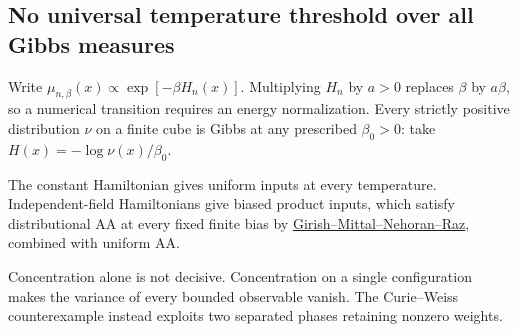 \subsection{No universal temperature threshold over all Gibbs measures}

Write $\mu_{n,\beta}(x)\propto\exp[-\beta H_n(x)]$. Multiplying $H_n$ by $a>0$ replaces $\beta$ by $a\beta$, so a numerical transition requires an energy normalization. Every strictly positive distribution $\nu$ on a finite cube is Gibbs at any prescribed $\beta_0>0$: take $H(x)=-\log\nu(x)/\beta_0$.

The constant Hamiltonian gives uniform inputs at every temperature. Independent-field Hamiltonians give biased product inputs, which satisfy distributional AA at every fixed finite bias by \href{https://arxiv.org/abs/2609.35327}{Girish--Mittal--Nehoran--Raz}, combined with uniform AA.

Concentration alone is not decisive. Concentration on a single configuration makes the variance of every bounded observable vanish. The Curie--Weiss counterexample instead exploits two separated phases retaining nonzero weights.

